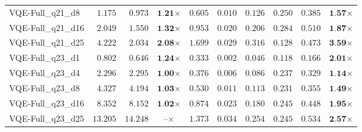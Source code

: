 \begin{table*}[t]
{\begin{tabular}{| l || r r c || r r r r r c |}
VQE-Full\_q21\_d8 & $1.175$ & $0.973$ & $\textbf{1.21}$$\times$ & $0.605$ & $0.010$ & $0.126$ & $0.250$ & $0.385$ & $\textbf{1.57}$$\times$ \\
VQE-Full\_q21\_d16 & $2.049$ & $1.550$ & $\textbf{1.32}$$\times$ & $0.953$ & $0.020$ & $0.206$ & $0.284$ & $0.510$ & $\textbf{1.87}$$\times$ \\
VQE-Full\_q21\_d25 & $4.222$ & $2.034$ & $\textbf{2.08}$$\times$ & $1.699$ & $0.029$ & $0.316$ & $0.128$ & $0.473$ & $\textbf{3.59}$$\times$ \\
VQE-Full\_q23\_d1 & $0.802$ & $0.646$ & $\textbf{1.24}$$\times$ & $0.333$ & $0.002$ & $0.046$ & $0.118$ & $0.166$ & $\textbf{2.01}$$\times$ \\
VQE-Full\_q23\_d4 & $2.296$ & $2.295$ & $\textbf{1.00}$$\times$ & $0.376$ & $0.006$ & $0.086$ & $0.237$ & $0.329$ & $\textbf{1.14}$$\times$ \\
VQE-Full\_q23\_d8 & $4.327$ & $4.194$ & $\textbf{1.03}$$\times$ & $0.530$ & $0.011$ & $0.113$ & $0.231$ & $0.355$ & $\textbf{1.49}$$\times$ \\
VQE-Full\_q23\_d16 & $8.352$ & $8.152$ & $\textbf{1.02}$$\times$ & $0.874$ & $0.023$ & $0.180$ & $0.245$ & $0.448$ & $\textbf{1.95}$$\times$ \\
VQE-Full\_q23\_d25 & $13.205$ & $14.248$ & $\textbf{--}$$\times$ & $1.373$ & $0.034$ & $0.254$ & $0.245$ & $0.534$ & $\textbf{2.57}$$\times$ \\
\hline
\end{tabular}
}
\end{table*}

